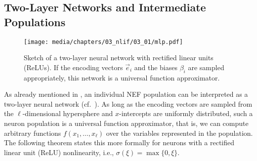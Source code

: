 
\subsection{Two-Layer Networks and Intermediate Populations}
\label{sec:two_layer_intermediate}

\begin{figure}
	\texttt{[image: media/chapters/03\_nlif/03\_01/mlp.pdf]}
	\caption[Sketch of a two-layer neural network]{Sketch of a two-layer neural network with rectified linear units (ReLUs). If the encoding vectors $\vec e_i$ and the biases $\beta_i$ are sampled appropriately, this network is a universal function approximator.}
	\label{fig:mlp}
\end{figure}

As already mentioned in , an individual NEF population can be interpreted as a two-layer neural network (cf.~).
As long as the encoding vectors are sampled from the $\ell$-dimensional hypersphere and $x$-intercepts are uniformly distributed, such a neuron population is a universal function approximator, that is, we can compute arbitrary functions $f(x_1, \ldots, x_\ell)$ over the variables represented in the population.
The following theorem states this more formally for neurons with a rectified linear unit (ReLU) nonlinearity, i.e., $\sigma(\xi) = \max\{0, \xi\}$.

